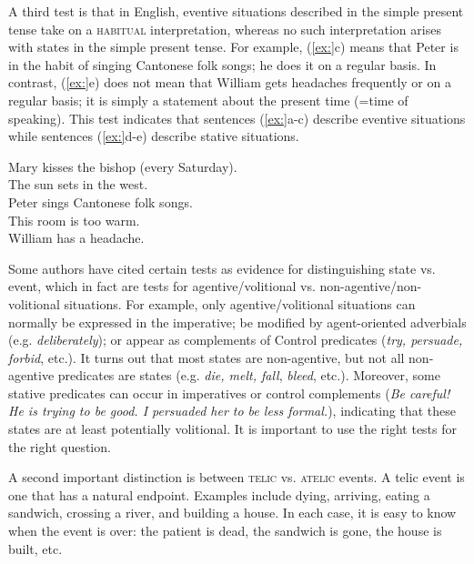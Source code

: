 A third test is that in English, eventive situations described in the simple present tense take on a \textsc{habitual} interpretation, whereas no such interpretation arises with states in the simple present tense. For example, (\ref{ex:}c) means that Peter is in the habit of singing Cantonese folk songs; he does it on a regular basis. In contrast, (\ref{ex:}e) does not mean that William gets headaches frequently or on a regular basis; it is simply a statement about the present time (=time of speaking). This test indicates that sentences (\ref{ex:}a-c) describe eventive situations while sentences (\ref{ex:}d-e) describe stative situations.


\ea
\ea Mary kisses the bishop (every Saturday).\\
\ex The sun sets in the west.\\
\ex Peter sings Cantonese folk songs.\\
\ex This room is too warm.\\
\ex William has a headache.
                       \z
\z


Some authors have cited certain tests as evidence for distinguishing state vs. event, which in fact are tests for agentive/volitional vs. non-agentive/non-volitional situations. For example, only agentive/volitional situations can normally be expressed in the imperative; be modified by agent-oriented adverbials (e.g. \textit{deliberately}); or appear as complements of Control predicates (\textit{try, persuade, forbid}, etc.). It turns out that most states are non-agentive, but not all non-agentive predicates are states (e.g. \textit{die, melt, fall}, \textit{bleed}, etc.). Moreover, some stative predicates can occur in imperatives or control complements (\textit{Be careful! He is trying to be good. I persuaded her to be less formal.}), indicating that these states are at least potentially volitional. It is important to use the right tests for the right question.



A second important distinction is between \textsc{telic} vs. \textsc{atelic} events. A telic event is one that has a natural endpoint. Examples include dying, arriving, eating a sandwich, crossing a river, and building a house. In each case, it is easy to know when the event is over: the patient is dead, the sandwich is gone, the house is built, etc.



